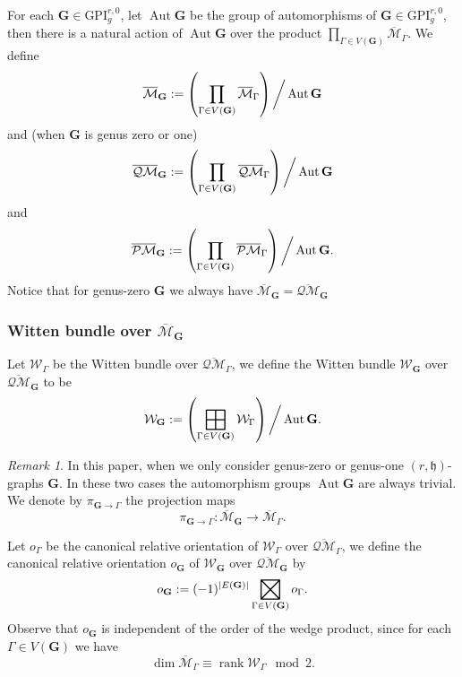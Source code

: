 \documentclass[11pt]{amsart}
\theoremstyle{definition}
\theoremstyle{remark}
\newtheorem{rmk}[dummy]{Remark}
\newcommand{\oPMb}{{\overline{\mathcal{PM}}}}
\newcommand{\oQMb}{{\overline{\mathcal{QM}}}}
\newcommand{\<}{\left<}
\renewcommand{\>}{\right>}
\numberwithin{equation}{section}
\def\Mbar{{\overline{\mathcal M}}}
\def\GPI{{\text{GPI}}}
\def\h{{\mathfrak h}}
\DeclareMathOperator*{\bboxplus}{\scalerel*{\boxplus}{\sum}}
\DeclareMathOperator*{\bboxtimes}{\scalerel*{\boxtimes}{\sum}}
\begin{document}
For each $\mathbf{G}\in \GPI^{r,0}_g$, let $\operatorname{Aut} \mathbf{G}$ be the group of automorphisms of $\mathbf{G}\in \GPI^{r,0}_g$, then there is a natural action of $\operatorname{Aut} \mathbf{G}$ over the product $\prod_{\Gamma\in V(\mathbf{G})} \Mbar_\Gamma$. We define 
$$
\Mbar_\mathbf{G}:=\left(\prod_{\Gamma\in V(\mathbf{G})} \Mbar_\Gamma\right)\bigg\slash \operatorname{Aut} \mathbf{G}
$$
and (when $\mathbf{G}$ is genus zero or one)
$$
\oQMb_\mathbf{G}:=\left(\prod_{\Gamma\in V(\mathbf{G})} \oQMb_\Gamma\right)\bigg\slash \operatorname{Aut} \mathbf{G}
$$
and
$$
\oPMb_\mathbf{G}:=\left(\prod_{\Gamma\in V(\mathbf{G})} \oPMb_\Gamma\right)\bigg\slash \operatorname{Aut} \mathbf{G}.
$$
Notice that for genus-zero $\mathbf{G}$ we always have  $\Mbar_\mathbf{G}=\oQMb_\mathbf{G}$
\subsubsection{Witten bundle over $\Mbar_\mathbf{G}$}
Let $\mathcal W_\Gamma$ be the Witten bundle over $\oQMb_\Gamma$, we define the Witten bundle $\mathcal W_\mathbf{G}$ over $\oQMb_\mathbf{G}$ to be 
$$
 \mathcal W_\mathbf{G}:= \left(\bboxplus_{\Gamma\in V(\mathbf{G})}\mathcal W_\Gamma\right)\bigg\slash \operatorname{Aut} \mathbf{G}.
$$
\begin{rmk}\label{rmk aut trivial}
    In this paper, when we only consider genus-zero or genus-one  $(r,\h)$-graphs $\mathbf{G}$. In these two cases the automorphism groups $\operatorname{Aut}\mathbf{G}$ are always trivial. We denote by $\pi_{\mathbf{G}\to\Gamma}$ the projection maps 
    $$
\pi_{\mathbf{G}\to\Gamma}\colon \Mbar_{\mathbf{G}}\to \Mbar_\Gamma. 
$$
\end{rmk}
Let $o_\Gamma$ be the canonical relative orientation of $\mathcal W_\Gamma$ over $\oQMb_\Gamma$, we define the canonical relative orientation $o_\mathbf{G}$ of $\mathcal W_\mathbf{G}$ over $\oQMb_\mathbf{G}$ by
\begin{equation}\label{eq orientation point insertion}
    o_\mathbf{G}:=(-1)^{\lvert E(\mathbf{G})\rvert}\bboxtimes_{\Gamma\in V(\mathbf{G})}  o_\Gamma.
\end{equation}
Observe that $o_\mathbf{G}$ is independent of the order of the wedge product, since for each $\Gamma\in V(\mathbf{G})$ we have 
$$
\dim \Mbar_\Gamma \equiv \operatorname{rank} \mathcal W_\Gamma \mod 2.
$$
\end{document}
